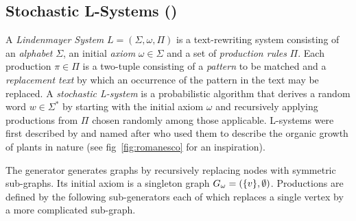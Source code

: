 \documentclass{graphstudy}
\begin{document}
\subsection{Stochastic L-Systems ()}
\label{sec:lindenmayer}

A \emph{Lindenmayer System} \(L=(\Sigma,\omega,\Pi)\) is a text-rewriting system consisting of an \emph{alphabet}
\(\Sigma\), an initial \emph{axiom} \(\omega\in\Sigma\) and a set of \emph{production rules} \(\Pi\).  Each production
\(\pi\in\Pi\) is a two-tuple consisting of a \emph{pattern} to be matched and a \emph{replacement text} by which an
occurrence of the pattern in the text may be replaced.  A \emph{stochastic L-system} is a probabilistic algorithm that
derives a random word \(w\in\Sigma^*\) by starting with the initial axiom \(\omega\) and recursively applying
productions from \(\Pi\) chosen randomly among those applicable.  L-systems were first described by and named after
\textcite{Lindenmayer1990} who used them to describe the organic growth of plants in nature (see
\acl{fig}~\ref{fig:romanesco} for an inspiration).

\begin{Figure}
  \begin{center}
  \end{center}
  \caption[Romanesco Broccoli]{%
    \emph{Romanesco broccoli} is a particular spectacular example of a self-similar plant that may be modeled using a
    stochastic L-system.  [Original photo by Jon Sullivan (2004), public domain.]
  }
  \label{fig:romanesco}
\end{Figure}

The  generator generates graphs by recursively replacing nodes with symmetric sub-graphs.  Its initial
axiom is a singleton graph \(G_\omega=(\{v\}, \emptyset)\).  Productions are defined by the following
sub-generators each of which replaces a single vertex by a more complicated sub-graph.
\end{document}
